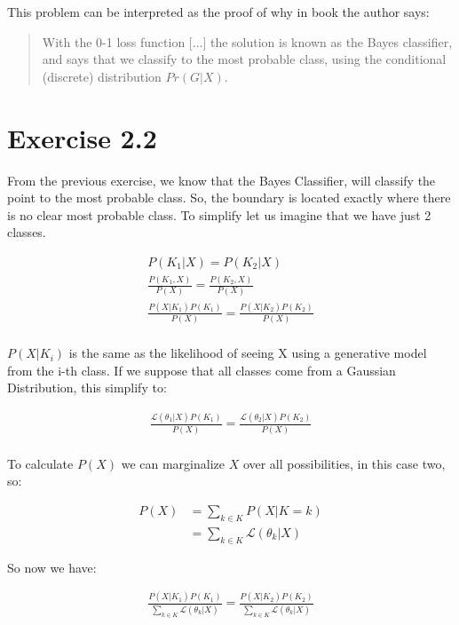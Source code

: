 \documentclass[10pt,a4paper]{article}
\begin{document}
	This problem can be interpreted as the proof of why in book the author says:
	\begin{quote}
		With the 0-1 loss function [...] the solution is known as the Bayes classifier, and says that
		we classify to the most probable class, using the conditional (discrete) distribution $Pr(G|X)$.
	\end{quote}

	\section{Exercise 2.2}
	
	From the previous exercise, we know that the Bayes Classifier, will classify the point to the most probable class. So, the boundary is located exactly where there is no clear most probable class. 
	To simplify let us imagine that we have just 2 classes.
	
	\begin{align*}
		P(K_1|X) = P(K_2|X)\\
		\frac{P(K_1,X)}{P(X)} = \frac{P(K_2,X)}{P(X)}\\
		\frac{P(X|K_1)P(K_1)}{P(X)} = \frac{P(X|K_2)P(K_2)}{P(X)}\\
	\end{align*}
	
	$P(X|K_i)$ is the same as the likelihood of seeing X using a generative model from the i-th class. If we suppose that all classes come from a Gaussian Distribution, this simplify to:
	
	\begin{align*}
		\frac{\mathcal{L}(\theta_1|X)P(K_1)}{P(X)} = \frac{\mathcal{L}(\theta_2|X)P(K_2)}{P(X)}\\
	\end{align*}
	
	To calculate $P(X)$ we can marginalize $X$ over all possibilities, in this case two, so:
	
	\begin{align*}
		P(X) &= \sum_{k\in K}{P(X|K=k)}\\
		&= \sum_{k\in K}{\mathcal{L}(\theta_k|X)}
	\end{align*}
	
	So now we have:
	
	\begin{align*}
		\frac{P(X|K_1)P(K_1)}{\sum_{k\in K}{\mathcal{L}(\theta_k|X)}} = \frac{P(X|K_2)P(K_2)}{\sum_{k\in K}{\mathcal{L}(\theta_k|X)}}\\
	\end{align*}
	
\end{document}
